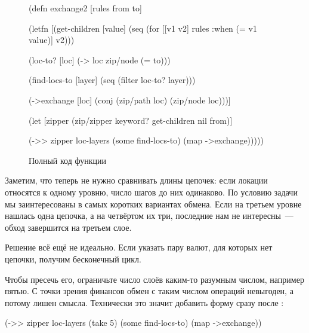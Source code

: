 \begin{figure}[ht!]

\begin{english}
  \begin{clojure}
(defn exchange2 [rules from to]

  (letfn [(get-children [value]
            (seq (for [[v1 v2] rules
                       :when (= v1 value)]
                   v2)))

          (loc-to? [loc]
            (-> loc zip/node (= to)))

          (find-locs-to [layer]
            (seq (filter loc-to? layer)))

          (->exchange [loc]
            (conj (zip/path loc) (zip/node loc)))]

    (let [zipper (zip/zipper keyword?
                             get-children
                             nil
                             from)]

      (->> zipper
           loc-layers
           (some find-locs-to)
           (map ->exchange)))))
  \end{clojure}
\end{english}

\captionsetup{labelformat=lis}
\caption{Полный код функции }

\label{fig:chart-xml-04}

\end{figure}

Заметим, что теперь не нужно сравнивать длины цепочек: если локации относятся к
одному уровню, число шагов до них одинаково. По условию задачи мы заинтересованы
в самых коротких вариантах обмена. Если на третьем уровне нашлась одна цепочка,
а на четвёртом их три, последние нам не интересны~--- обход завершится на третьем
слое.


Решение всё ещё не идеально. Если указать пару валют, для которых нет цепочки,
получим бесконечный цикл.

Чтобы пресечь его, ограничьте число слоёв каким-то разумным числом, например
пятью. С точки зрения финансов обмен с таким числом операций невыгоден, а потому
лишен смысла. Технически это значит добавить форму  сразу после
:

\begin{english}
  \begin{clojure}
(->> zipper
     loc-layers
     (take 5)
     (some find-locs-to)
     (map ->exchange))
  \end{clojure}
\end{english}

